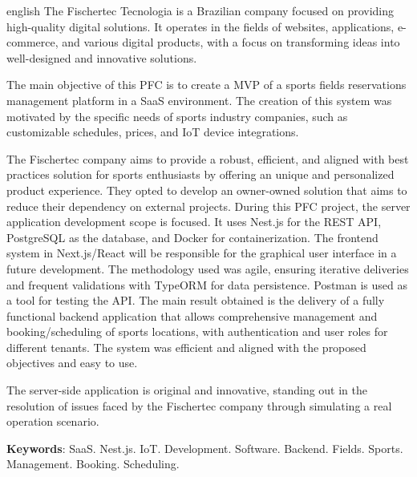 
\begin{resumo}[Abstract]
	\SingleSpacing
	\begin{otherlanguage*}{english}
		The Fischertec Tecnologia is a Brazilian company focused on providing high-quality digital solutions. It operates in the fields of websites, applications, e-commerce, and various digital products, with a focus on transforming ideas into well-designed and innovative solutions.

		The main objective of this PFC is to create a \acrfull{MVP} of a sports fields reservations management platform in a \acrfull{SaaS} environment. The creation of this system was motivated by the specific needs of sports industry companies, such as customizable schedules, prices, and IoT device integrations.

		The Fischertec company aims to provide a robust, efficient, and aligned with best practices solution for sports enthusiasts by offering an unique and personalized product experience. They opted to develop an owner-owned solution that aims to reduce their dependency on external projects.
		During this PFC project, the server application development scope is focused. It uses Nest.js for the \acrshort{REST} \acrshort{API}, PostgreSQL as the database, and Docker for containerization. The frontend system in Next.js/React will be responsible for the graphical user interface in a future development.
		The methodology used was agile, ensuring iterative deliveries and frequent validations with TypeORM for data persistence. Postman is used as a tool for testing the \acrshort{API}.
		The main result obtained is the delivery of a fully functional backend application that allows comprehensive management and booking/scheduling of sports locations, with authentication and user roles for different tenants. The system was efficient and aligned with the proposed objectives and easy to use.

		The server-side application is original and innovative, standing out in the resolution of issues faced by the Fischertec company through simulating a real operation scenario.
		
		\textbf{Keywords}: \acrshort{SaaS}. Nest.js. \acrshort{IoT}. Development. Software. Backend. Fields. Sports. Management. Booking. Scheduling.
	\end{otherlanguage*}
\end{resumo}

